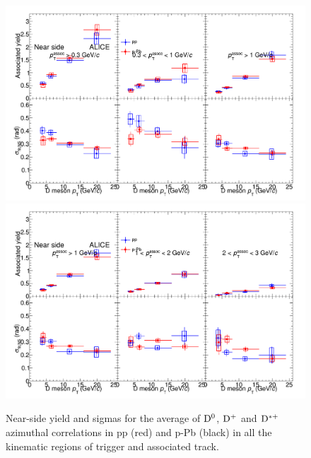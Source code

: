 \begin{figure}
\centering
\includegraphics[width=.95\linewidth]{figures/CfrPPandModels/CompareFitResults_ppVspPb_5TeV_1.png}
\includegraphics[width=.95\linewidth]{figures/CfrPPandModels/CompareFitResults_ppVspPb_5TeV_2.png}
\caption{Near-side yield and sigmas for the average of ${\rm D^0}$, ${\rm D^+}$ and ${\rm D^{*+}}$ azimuthal correlations in pp (red) and p-Pb (black) in all the kinematic regions of trigger and associated track.}
\label{fig:pp-pPb_Fit}
\end{figure}


